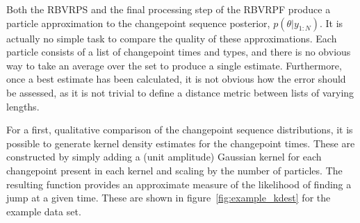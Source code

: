 \documentclass[journal]{IEEEtran}
\begin{document}
Both the RBVRPS and the final processing step of the RBVRPF produce a particle approximation to the changepoint sequence posterior, $p(\theta|y_{1:N})$. It is actually no simple task to compare the quality of these approximations. Each particle consists of a list of changepoint times and types, and there is no obvious way to take an average over the set to produce a single estimate. Furthermore, once a best estimate has been calculated, it is not obvious how the error should be assessed, as it is not trivial to define a distance metric between lists of varying lengths.

For a first, qualitative comparison of the changepoint sequence distributions, it is possible to generate kernel density estimates for the changepoint times. These are constructed by simply adding a (unit amplitude) Gaussian kernel for each changepoint present in each kernel and scaling by the number of particles. The resulting function provides an approximate measure of the likelihood of finding a jump at a given time. These are shown in figure~\ref{fig:example_kdest} for the example data set.
\end{document}
